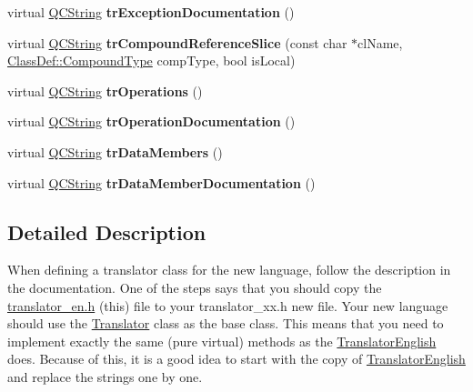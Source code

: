 \begin{DoxyCompactItemize}
\mbox{\label{class_translator_english_a69b98548bfba4d6baf62ca6b4c507b8e}} 
virtual \mbox{\hyperlink{class_q_c_string}{Q\+C\+String}} {\bfseries tr\+Exception\+Documentation} ()
\item 
\mbox{\label{class_translator_english_a82b13c17d55f41cfa9861525449c6097}} 
virtual \mbox{\hyperlink{class_q_c_string}{Q\+C\+String}} {\bfseries tr\+Compound\+Reference\+Slice} (const char $\ast$cl\+Name, \mbox{\hyperlink{class_class_def_ae70cf86d35fe954a94c566fbcfc87939}{Class\+Def\+::\+Compound\+Type}} comp\+Type, bool is\+Local)
\item 
\mbox{\label{class_translator_english_ae599dd9758c9ac46ded5e032b5aeb0ad}} 
virtual \mbox{\hyperlink{class_q_c_string}{Q\+C\+String}} {\bfseries tr\+Operations} ()
\item 
\mbox{\label{class_translator_english_ae14c8c082af6078fe12c3e7ad5e27edb}} 
virtual \mbox{\hyperlink{class_q_c_string}{Q\+C\+String}} {\bfseries tr\+Operation\+Documentation} ()
\item 
\mbox{\label{class_translator_english_a01658073fa6d3c7bed2daa363e8a0244}} 
virtual \mbox{\hyperlink{class_q_c_string}{Q\+C\+String}} {\bfseries tr\+Data\+Members} ()
\item 
\mbox{\label{class_translator_english_a6a0c73e8a4365f09422bc39832b6bfb1}} 
virtual \mbox{\hyperlink{class_q_c_string}{Q\+C\+String}} {\bfseries tr\+Data\+Member\+Documentation} ()
\end{DoxyCompactItemize}


\subsection{Detailed Description}
When defining a translator class for the new language, follow the description in the documentation. One of the steps says that you should copy the \mbox{\hyperlink{translator__en_8h_source}{translator\+\_\+en.\+h}} (this) file to your translator\+\_\+xx.\+h new file. Your new language should use the \mbox{\hyperlink{class_translator}{Translator}} class as the base class. This means that you need to implement exactly the same (pure virtual) methods as the \mbox{\hyperlink{class_translator_english}{Translator\+English}} does. Because of this, it is a good idea to start with the copy of \mbox{\hyperlink{class_translator_english}{Translator\+English}} and replace the strings one by one.

